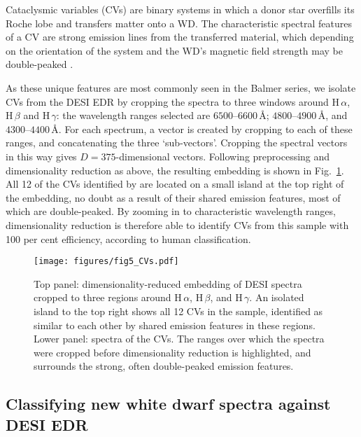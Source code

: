 \documentclass[fleqn,usenatbib]{mnras}
\begin{document}
Cataclysmic variables (CVs) are binary systems in which a donor star overfills its Roche lobe and transfers matter onto a WD.
The characteristic spectral features of a CV are strong emission lines from the transferred material, which depending on the orientation of the system and the WD's magnetic field strength may be double-peaked \citep{smak69, huang72}.

As these unique features are most commonly seen in the Balmer series, we isolate CVs from the DESI EDR by cropping the spectra to three windows around H$\,\alpha$, H$\,\beta$ and H$\,\gamma$:
the wavelength ranges selected are $6500$--$6600\,\text{\AA}$; $4800$--$4900\,\text{\AA}$, and $4300$--$4400\,\text{\AA}$.
For each spectrum, a vector is created by cropping to each of these ranges, and concatenating the three `sub-vectors'.
Cropping the spectral vectors in this way gives $D=375$-dimensional vectors.
Following preprocessing and dimensionality reduction as above, the resulting embedding is shown in Fig.~\ref{fig:CVs}.
All 12 of the CVs identified by \citet{manser24} are located on a small island at the top right of the embedding, no doubt as a result of their shared emission features, most of which are double-peaked.
By zooming in to characteristic wavelength ranges, dimensionality reduction is therefore able to identify CVs from this sample with 100 per cent efficiency, according to human classification.

\begin{figure}
\centering
\texttt{[image: figures/fig5\_CVs.pdf]}
\caption{
    Top panel: dimensionality-reduced embedding of DESI spectra cropped to three regions around H\,$\alpha$, H\,$\beta$, and H\,$\gamma$.
    An isolated island to the top right shows all 12 CVs in the sample, identified as similar to each other by shared emission features in these regions.
    Lower panel: spectra of the CVs.
    The ranges over which the spectra were cropped before dimensionality reduction is highlighted, and surrounds the strong, often double-peaked emission features.
}
\label{fig:CVs}
\end{figure}


\subsection{Classifying new white dwarf spectra against DESI EDR}
\end{document}
